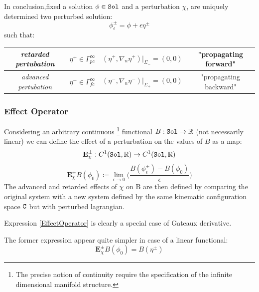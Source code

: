\documentclass[Main]{subfiles}
\begin{document}
		In conclusion,fixed a solution $\phi\in \mathtt{Sol}$ and a perturbation $\chi$, are uniquely determined two perturbed solution:
   		\begin{equation}\label{PerturbedSolution}
   			\phi^\pm_\epsilon = \phi + \epsilon \eta^\pm
   		\end{equation}
   		such that:
 		\begin{center}   \begin{tabular}{|c|c|c|c|}
   		\hline
  	 		\emph{retarded pertubation} & $\eta^+ \in \Gamma^\infty_{pc}$ & $(\eta^+, \nabla_n \eta^+ ) \big \vert_{\Sigma_{-}} = (0,0)$ & "propagating forward" \\
  	 		\hline
   			\emph{advanced pertubation} &$\eta^- \in \Gamma^\infty_{fc}$ & $(\eta^-, \nabla_n \eta^- ) \big \vert_{\Sigma_{+}} = (0,0)$ & "propagating backward" \\
   			\hline
   		\end{tabular}	\end{center} 	
		
			
   		
		\subsubsection{Effect Operator}
		Considering an arbitrary continuous \danger\footnote{The precise notion of continuity require the specification of the infinite dimensional manifold structure.} functional $B: \mathtt{Sol} \rightarrow \mathbb{R}$ (not necessarily linear) we can define the effect of a perturbation on the values of $B$\cite[pag. 5]{Marolf1993} as a map:
		\begin{displaymath}
			\mathbf{E}^\pm_\chi : C^1(\mathtt{Sol},\mathbb{R}) \rightarrow C^1(\mathtt{Sol},\mathbb{R})
		\end{displaymath}
		\begin{equation}\label{EffectOperator}
		\mathbf{E}_\chi^\pm B ( \phi_0) 
		\coloneqq \lim_{\epsilon \rightarrow 0}
		 \biggr( \frac{B(\phi_\epsilon^\pm) - B (\phi_0)}{\epsilon} \biggr)
		\end{equation}
		The advanced and retarded effects of $\chi$ on B are then defined by comparing the original system with a new system defined by the same kinematic configuration space $\mathtt{C}$ but with perturbed lagrangian.
		\begin{observation}
			Expression \ref{EffectOperator} is clearly a special case of Gateaux derivative.\cite{Blanchard2015}
		\end{observation}
		
		
		The former expression appear quite simpler in case of a linear functional:
			\begin{equation}\label{EffectOperatorLinear}
				\mathbf{E}_\chi^\pm B ( \phi_0) =  B(\eta^\pm)
			\end{equation}
		
\end{document}
